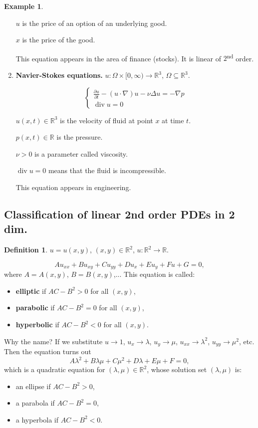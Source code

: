 \documentclass[12pt]{article}
\DeclareMathOperator{\diver}{div}
\theoremstyle{definition}
\newtheorem*{definition*}{Definition}
\newtheorem*{example*}{Example}
\begin{document}
\begin{example*}
\begin{enumerate}[label=\alph*)]
$u$ is the price of an option of an underlying good.

$x$ is the price of the good.

This equation appears in the area of finance (stocks). It is linear of $2$\textsuperscript{nd} order.

\item \textbf{Navier-Stokes equations.} $u:\Omega\times[0,\infty)\rightarrow\mathbb{R}^3$, $\Omega\subseteq\mathbb{R}^3$.

\[\left\{\begin{array}{l}\displaystyle{\frac{\partial u}{\partial t}-(u\cdot\nabla)u-\nu\Delta u=-\nabla p}\\\diver u=0\end{array}\right.\]

$u(x,t)\in\mathbb{R}^3$ is the velocity of fluid at point $x$ at time $t$.

$p(x,t)\in\mathbb{R}$ is the pressure.

$\nu>0$ is a parameter called viscosity.

$\diver u=0$ means that the fluid is incompressible.

This equation appears in engineering.
\end{enumerate}
\end{example*}

\subsection*{Classification of linear 2nd order PDEs in 2 dim.}

\begin{definition*}
$u=u(x,y)$, $(x,y)\in\mathbb{R}^2$, $u:\mathbb{R}^2\rightarrow\mathbb{R}$.

\[Au_{xx}+Bu_{xy}+Cu_{yy}+Du_x+Eu_y+Fu+G=0,\]
where $A=A(x,y)$, $B=B(x,y)$,... This equation is called:
\begin{itemize}
\item \textbf{elliptic} if $AC-B^2>0$ for all $(x,y)$,
\item \textbf{parabolic} if $AC-B^2=0$ for all $(x,y)$,
\item \textbf{hyperbolic} if $AC-B^2<0$ for all $(x,y)$.
\end{itemize}
\end{definition*}

Why the name? If we substitute $u\to1$, $u_x\to\lambda$, $u_y\to\mu$, $u_{xx}\to\lambda^2$, $u_{yy}\to\mu^2$, etc. Then the equation turns out
\[A\lambda^2+B\lambda\mu+C\mu^2+D\lambda+E\mu+F=0,\]
which is a quadratic equation for $(\lambda,\mu)\in\mathbb{R}^2$, whose solution set $(\lambda,\mu)$ is:
\begin{itemize}
\item an ellipse if $AC-B^2>0$,
\item a parabola if $AC-B^2=0$,
\item a hyperbola if $AC-B^2<0$.
\end{itemize}
\end{document}
